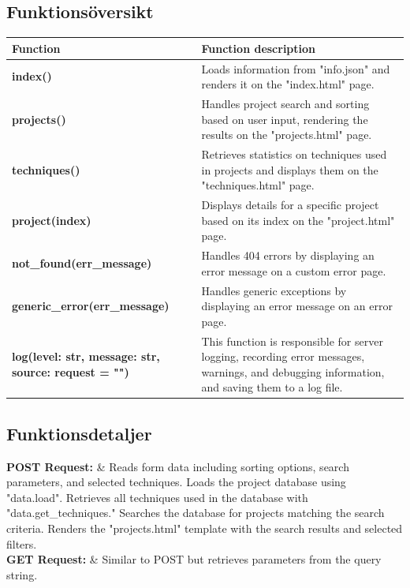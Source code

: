 \documentclass{liu_mall}
\begin{document}
    \subsection{Funktionsöversikt}
    \begin{table}[!h]
        \begin{tabularx}{\textwidth}{p{5cm}|p{10.65cm}}
            \hline
            \textbf{Function} & Function description\\
            \hline
            \textbf{index()} & Loads information from "info.json" and renders it on the "index.html" page.\\
            \hline
            \textbf{projects()} & Handles project search and sorting based on user input, rendering the results on the "projects.html" page.\\
            \hline
            \textbf{techniques()} & Retrieves statistics on techniques used in projects and displays them on the "techniques.html" page.\\
            \hline
            \textbf{project(index)} &  
            Displays details for a specific project based on its index on the "project.html" page.\\
            \hline
            \textbf{not\_found(err\_message)} &  
            Handles 404 errors by displaying an error message on a custom error page.\\
            \hline
            \textbf{generic\_error(err\_message)} & Handles generic exceptions by displaying an error message on an error page.\\
            \hline
            \textbf{log(level: str,\newline
                    message: str,\newline
                    source: request = "")} &
                    This function is responsible for server logging, recording error messages,
                    warnings, and debugging information, and saving them to a log file.\\
            \hline
        \end{tabularx}
        \label{table:funktions}
    \end{table}
    
    \subsection{Funktionsdetaljer}
    
    \iffalse
    \hline
    \textbf{POST Request:} & Reads form data including sorting options, search parameters, and selected techniques.
        Loads the project database using "data.load".
        Retrieves all techniques used in the database with "data.get\_techniques."
        Searches the database for projects matching the search criteria.
        Renders the "projects.html" template with the search results and selected filters.\\
        \hline
    \textbf{GET Request:}  & Similar to POST but retrieves parameters from the query string. \\
\end{document}
